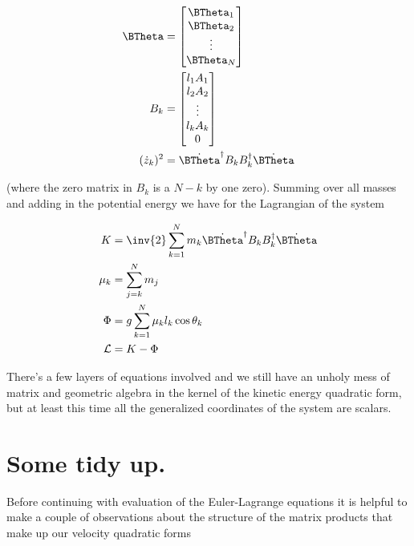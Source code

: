 \begin{align}\label{eqn:multiPendulumSpherical2:boo4}
\BTheta &=
\begin{bmatrix}
\BTheta_1 \\
\BTheta_2 \\
\vdots \\
\BTheta_N \\
\end{bmatrix} \\
B_k &=
\begin{bmatrix}
l_1 A_1 \\
l_2 A_2 \\
\vdots \\
l_k A_k \\
0 \\
\end{bmatrix} \\
(\dot{z}_k)^2 &=
\dot{\BTheta}^\dagger B_k B_k^\dagger \dot{\BTheta}
\end{align}

(where the zero matrix in $B_k$ is a $N-k$ by one zero).  Summing over all masses and adding in the potential energy we have for the Lagrangian of the system


\begin{align}\label{eqn:multiPendulumSpherical2:boo5b}
K &=
\inv{2} \sum_{k=1}^N m_k
\dot{\BTheta}^\dagger
B_k B_k^\dagger
\dot{\BTheta} \\
\mu_k &= \sum_{j=k}^N m_j \\
\Phi &=
g \sum_{k=1}^N \mu_k l_k \cos\theta_k \\
\LL &= K - \Phi
\end{align}

There's a few layers of equations involved and we still have an unholy mess of matrix and geometric algebra in the kernel of the kinetic energy quadratic form, but at least this time all the generalized coordinates of the system are scalars.

\section{Some tidy up.}

Before continuing with evaluation of the Euler-Lagrange equations it is helpful to make a couple of observations about the structure of the matrix products that make up our velocity quadratic forms

